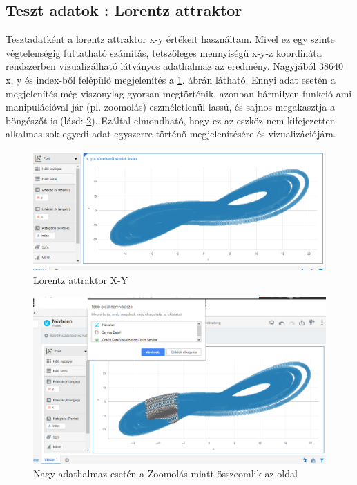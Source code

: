 	
	\subsection{Teszt adatok : Lorentz attraktor}
	Tesztadatként a lorentz attraktor x-y értékeit használtam. Mivel ez egy szinte végtelenségig futtatható számítás, tetszőleges mennyiségű x-y-z koordináta rendszerben vizualizálható látványos adathalmaz az eredmény. Nagyjából 38640 x, y és index-ből felépülő megjelenítés a \ref{fig:lorenztxy}. ábrán látható. Ennyi adat esetén a megjelenítés még viszonylag gyorsan megtörténik, azonban bármilyen funkció ami manipulációval jár (pl. zoomolás) eszméletlenül lassú, és sajnos megakasztja a böngészőt is (lásd: \ref{fig:kifagyott}). Ezáltal elmondható, hogy ez az eszköz nem kifejezetten alkalmas sok egyedi adat egyszerre történő megjelenítésére és vizualizációjára. 
	\begin{figure}
		\centering
		\includegraphics[width=1.0\linewidth]{dani_imgs/lorenzt_xy}
		\caption{Lorentz attraktor X-Y}
		\label{fig:lorenztxy}
	\end{figure}

	\begin{figure}
		\centering
		\includegraphics[width=1.0\linewidth]{dani_imgs/kifagyott}
		\caption{Nagy adathalmaz esetén a Zoomolás miatt összeomlik az oldal}
		\label{fig:kifagyott}
	\end{figure}
	
	